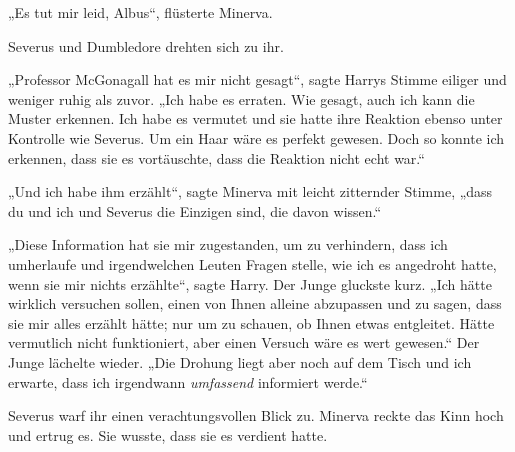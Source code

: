 „Es tut mir leid, Albus“, flüsterte Minerva.

Severus und Dumbledore drehten sich zu ihr.

„Professor McGonagall hat es mir nicht gesagt“, sagte Harrys Stimme eiliger und weniger ruhig als zuvor. „Ich habe es erraten. Wie gesagt, auch ich kann die Muster erkennen. Ich habe es vermutet und sie hatte ihre Reaktion ebenso unter Kontrolle wie Severus. Um ein Haar wäre es perfekt gewesen. Doch so konnte ich erkennen, dass sie es vortäuschte, dass die Reaktion nicht echt war.“

„Und ich habe ihm erzählt“, sagte Minerva mit leicht zitternder Stimme, „dass du und ich und Severus die Einzigen sind, die davon wissen.“

„Diese Information hat sie mir zugestanden, um zu verhindern, dass ich umherlaufe und irgendwelchen Leuten Fragen stelle, wie ich es angedroht hatte, wenn sie mir nichts erzählte“, sagte Harry. Der Junge gluckste kurz. „Ich hätte wirklich versuchen sollen, einen von Ihnen alleine abzupassen und zu sagen, dass sie mir alles erzählt hätte; nur um zu schauen, ob Ihnen etwas entgleitet. Hätte vermutlich nicht funktioniert, aber einen Versuch wäre es wert gewesen.“ Der Junge lächelte wieder. „Die Drohung liegt aber noch auf dem Tisch und ich erwarte, dass ich irgendwann \emph{umfassend} informiert werde.“

Severus warf ihr einen verachtungsvollen Blick zu. Minerva reckte das Kinn hoch und ertrug es. Sie wusste, dass sie es verdient hatte.

